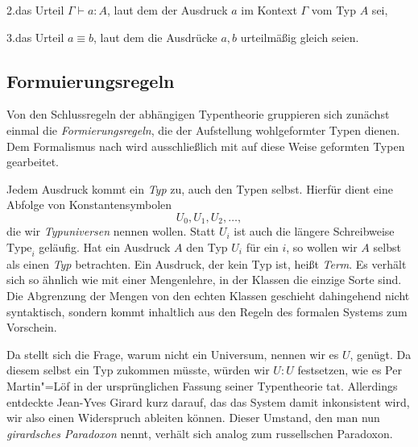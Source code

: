 2.\;das Urteil $\Gamma\vdash a\colon A$, laut dem der Ausdruck
$a$ im Kontext $\Gamma$ vom Typ $A$ sei,

3.\;das Urteil $a\equiv b$, laut dem die Ausdrücke
$a,b$ urteilmäßig gleich seien.

\subsection{Formuierungsregeln}

Von den Schlussregeln der abhängigen Typentheorie gruppieren sich
zunächst einmal die \emph{Formierungsregeln}, die der Aufstellung
wohlgeformter Typen dienen. Dem Formalismus nach wird ausschließlich
mit auf diese Weise geformten Typen gearbeitet.

Jedem Ausdruck kommt ein \emph{Typ} zu, auch den Typen selbst. Hierfür
dient eine Abfolge von Konstantensymbolen
\[U_0,U_1,U_2,\ldots,\]
die wir \emph{Typuniversen} nennen wollen. Statt $U_i$ ist auch die
längere Schreibweise $\mathrm{Type}_i$ geläufig. Hat ein Ausdruck $A$ den
Typ $U_i$ für ein $i$, so wollen wir $A$ selbst als einen \emph{Typ}
betrachten. Ein Ausdruck, der kein Typ ist, heißt \emph{Term}.
Es verhält sich so ähnlich wie mit einer Mengenlehre, in der Klassen
die einzige Sorte sind. Die Abgrenzung der Mengen von den echten Klassen
geschieht dahingehend nicht syntaktisch, sondern kommt inhaltlich aus
den Regeln des formalen Systems zum Vorschein.

Da stellt sich die Frage, warum nicht ein Universum, nennen wir es $U$,
genügt. Da diesem selbst ein Typ zukommen müsste, würden wir $U\colon U$
festsetzen, wie es Per Martin"=Löf in der ursprünglichen Fassung seiner
Typentheorie tat. Allerdings entdeckte Jean-Yves Girard kurz darauf, das
das System damit inkonsistent wird, wir also einen Widerspruch ableiten
können. Dieser Umstand, den man nun \emph{girardsches Paradoxon}
nennt, verhält sich analog zum russellschen Paradoxon.

